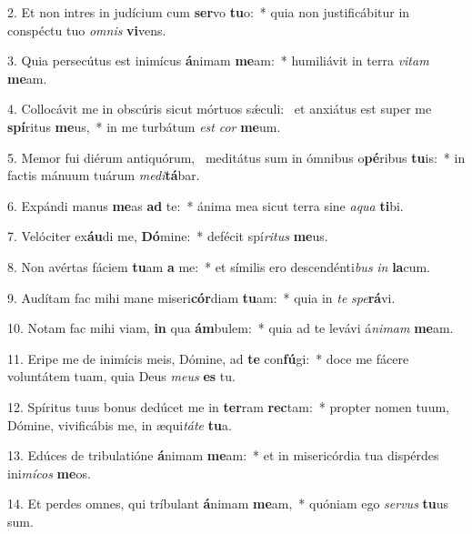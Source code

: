 2. Et non intres in judícium cum \textbf{ser}vo \textbf{tu}o:~*  quia non justificábitur in conspéctu tuo \textit{om}\textit{nis} \textbf{vi}vens.\

3. Quia persecútus est inimícus \textbf{á}nimam \textbf{me}am:~*  humiliávit in terra \textit{vi}\textit{tam} \textbf{me}am.\

4. Collocávit me in obscúris sicut mórtuos sǽculi: \dag\  et anxiátus est super me \textbf{spí}ritus \textbf{me}us,~*  in me turbátum \textit{est} \textit{cor} \textbf{me}um.\

5. Memor fui diérum antiquórum, \dag\  meditátus sum in ómnibus o\textbf{pé}ribus \textbf{tu}is:~*  in factis mánuum tuárum \textit{me}\textit{di}\textbf{tá}bar.\

6. Expándi manus \textbf{me}as \textbf{ad} te:~*  ánima mea sicut terra sine \textit{a}\textit{qua} \textbf{ti}bi.\

7. Velóciter ex\textbf{áu}di me, \textbf{Dó}mine:~*  defécit spí\textit{ri}\textit{tus} \textbf{me}us.\

8. Non avértas fáciem \textbf{tu}am \textbf{a} me:~*  et símilis ero descendénti\textit{bus} \textit{in} \textbf{la}cum.\

9. Audítam fac mihi mane miseri\textbf{cór}diam \textbf{tu}am:~*  quia in \textit{te} \textit{spe}\textbf{rá}vi.\

10. Notam fac mihi viam, \textbf{in} qua \textbf{ám}bulem:~*  quia ad te levávi á\textit{ni}\textit{mam} \textbf{me}am.\

11. Eripe me de inimícis meis, Dómine, ad \textbf{te} con\textbf{fú}gi:~*  doce me fácere voluntátem tuam, quia Deus \textit{me}\textit{us} \textbf{es} tu.\

12. Spíritus tuus bonus dedúcet me in \textbf{ter}ram \textbf{rec}tam:~*  propter nomen tuum, Dómine, vivificábis me, in æqui\textit{tá}\textit{te} \textbf{tu}a.\

13. Edúces de tribulatióne \textbf{á}nimam \textbf{me}am:~*  et in misericórdia tua dispérdes ini\textit{mí}\textit{cos} \textbf{me}os.\

14. Et perdes omnes, qui tríbulant \textbf{á}nimam \textbf{me}am,~*  quóniam ego \textit{ser}\textit{vus} \textbf{tu}us sum.\

